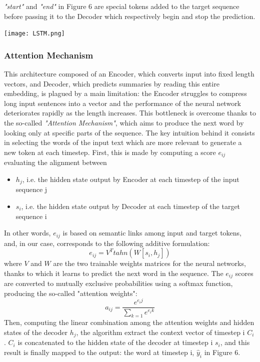 \documentclass[fleqn,10pt]{SelfArx} %
\begin{document}
\textit{"start"} and \textit{"end"} in Figure 6 are special tokens added to the target sequence before passing it to the Decoder which respectively begin and stop the prediction.\par
{\centering\vspace{10pt}
\texttt{[image: LSTM.png]}
\vspace{10pt}
\par}
\subsubsection{Attention Mechanism}
This architecture composed of an Encoder, which converts input into fixed length vectors, and Decoder, which predicts summaries by reading this entire embedding, is plagued by a main limitation: the Encoder struggles to compress long input sentences into a vector and the performance of the neural network deteriorates rapidly as the length increases. This bottleneck is overcome thanks to the so-called \textit{"Attention Mechanism"}, which aims to produce the next word by looking only at specific parts of the sequence. The key intuition behind it consists in selecting the words of the input text which are more relevant to generate a new token at each timestep. First, this is made by computing a score $e_{ij}$ evaluating the alignment between
\begin{itemize}
    \item $h_j$, i.e. the hidden state output by Encoder at each timestep of the input sequence j
    \item $s_i$, i.e. the hidden state output by Decoder at each timestep of the target sequence i 
\end{itemize}
In other words, $e_{ij}$ is based on semantic links among input and target tokens, and, in our case, corresponds to the following additive formulation:
$$e_{ij}=V^Ttahn(W[s_i,h_j])$$ 
where $V$ and $W$ are the two trainable weights matrices for the neural networks, thanks to which it learns to predict the next word in the sequence. The $e_{ij}$ scores are converted to mutually exclusive probabilities using a softmax function, producing the so-called "attention weights": 
$$a_{ij}=\frac{e^{e_ij}}{\sum_{k=1}e^{e_ik}}$$
Then, computing the linear combination among the attention weights and hidden states of the decoder $h_j$, the algorithm extract the context vector of timestep i $C_i$. $C_i$ is concatenated to the hidden state of the decoder at timestep i $s_i$, and this result is finally mapped to the output: the word at timestep i, $\hat{y}_i$ in Figure 6.
\end{document}
